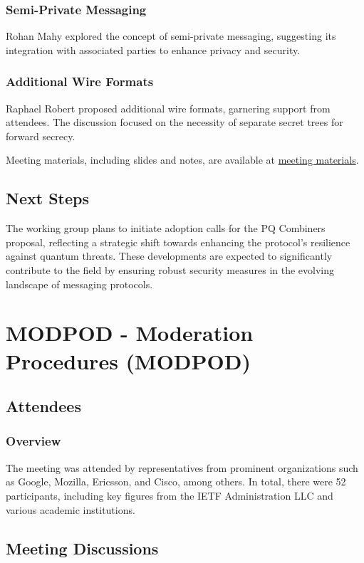 \documentclass{article}
\begin{document}
\subsubsection{Semi-Private Messaging}
Rohan Mahy explored the concept of semi-private messaging, suggesting its integration with associated parties to enhance privacy and security.

\subsubsection{Additional Wire Formats}
Raphael Robert proposed additional wire formats, garnering support from attendees. The discussion focused on the necessity of separate secret trees for forward secrecy.

Meeting materials, including slides and notes, are available at \href{https://datatracker.ietf.org/meeting/121/materials/slides-121-mls-chairs-slides-00}{meeting materials}.

\subsection{Next Steps}
The working group plans to initiate adoption calls for the PQ Combiners proposal, reflecting a strategic shift towards enhancing the protocol's resilience against quantum threats. These developments are expected to significantly contribute to the field by ensuring robust security measures in the evolving landscape of messaging protocols.




\newpage

\section{MODPOD - Moderation Procedures (MODPOD)}

\subsection{Attendees}
\subsubsection{Overview}
The meeting was attended by representatives from prominent organizations such as Google, Mozilla, Ericsson, and Cisco, among others. In total, there were 52 participants, including key figures from the IETF Administration LLC and various academic institutions.

\subsection{Meeting Discussions}
\end{document}
